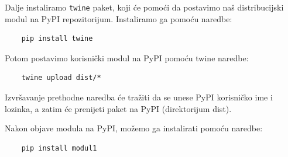 Dalje instaliramo \texttt{twine} paket, koji će pomoći da postavimo naš distribucijski modul na PyPI repozitorijum. Instaliramo ga pomoću   naredbe:
\begin{verbatim}
	pip install twine
\end{verbatim}
Potom postavimo korisnički   modul na PyPI pomoću twine naredbe:
\begin{verbatim}
	twine upload dist/*
\end{verbatim}
Izvršavanje prethodne naredba će tražiti da se unese PyPI korisničko ime i lozinka, a zatim će prenijeti      paket na PyPI (direktorijum dist).

Nakon  objave  modula na PyPI, možemo ga instalirati pomoću   naredbe:
\begin{verbatim}
	pip install modul1
\end{verbatim}


